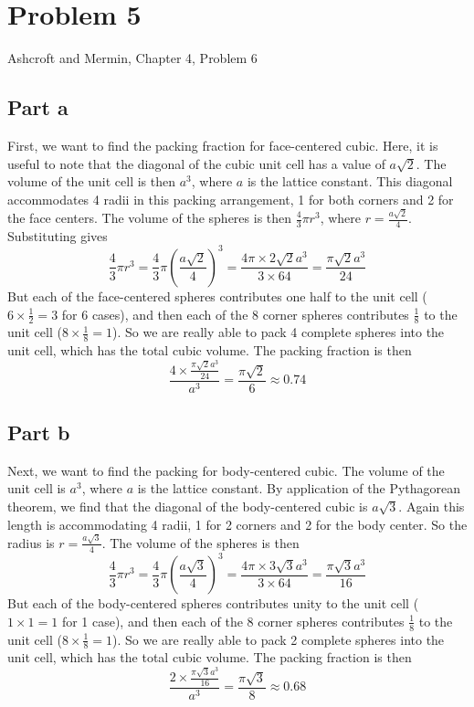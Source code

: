 \documentclass[12pt]{article}
\begin{document}
\section{Problem 5}
Ashcroft and Mermin, Chapter 4, Problem 6
\subsection{Part a}
First, we want to find the packing fraction for face-centered cubic. Here, it is useful to note that the diagonal of the cubic unit cell has a value of \(a\sqrt{2}\). The volume of the unit cell is then \(a^3\), where \(a\) is the lattice constant. This diagonal accommodates 4 radii in this packing arrangement, 1 for both corners and 2 for the face centers. The volume of the spheres is then \(\frac{4}{3}\pi r^3\), where \(r = \frac{a\sqrt{2}}{4}\). Substituting gives
\begin{equation}
    \frac{4}{3}\pi r^3 = \frac{4}{3}\pi \left(\frac{a\sqrt{2}}{4}\right)^3 = \frac{4\pi \times 2\sqrt{2}a^3}{3 \times 64} = \frac{\pi\sqrt{2}a^3}{24}
\end{equation}
But each of the face-centered spheres contributes one half to the unit cell ($6 \times \frac{1}{2} = 3$ for 6 cases), and then each of the 8 corner spheres contributes \(\frac{1}{8}\) to the unit cell ($8 \times \frac{1}{8} = 1$). So we are really able to pack 4 complete spheres into the unit cell, which has the total cubic volume. The packing fraction is then
\begin{equation}
    \frac{4 \times \frac{\pi\sqrt{2}a^3}{24}}{a^3} = \frac{\pi\sqrt{2}}{6} \approx 0.74
\end{equation}
\subsection{Part b}
Next, we want to find the packing for body-centered cubic. The volume of the unit cell is \(a^3\), where \(a\) is the lattice constant. By application of the Pythagorean theorem, we find that the diagonal of the body-centered cubic is \(a\sqrt{3}\). Again this length is accommodating 4 radii, 1 for 2 corners and 2 for the body center. So the radius is \(r = \frac{a\sqrt{3}}{4}\). The volume of the spheres is then
\begin{equation}
    \frac{4}{3}\pi r^3 = \frac{4}{3}\pi \left(\frac{a\sqrt{3}}{4}\right)^3 = \frac{4\pi \times 3\sqrt{3}a^3}{3 \times 64} = \frac{\pi\sqrt{3}a^3}{16}
\end{equation}
But each of the body-centered spheres contributes unity to the unit cell ($1 \times 1 = 1$ for 1 case), and then each of the 8 corner spheres contributes \(\frac{1}{8}\) to the unit cell ($8 \times \frac{1}{8} = 1$). So we are really able to pack 2 complete spheres into the unit cell, which has the total cubic volume. The packing fraction is then
\begin{equation}
    \frac{2 \times \frac{\pi\sqrt{3}a^3}{16}}{a^3} = \frac{\pi\sqrt{3}}{8} \approx 0.68
\end{equation}
\end{document}
